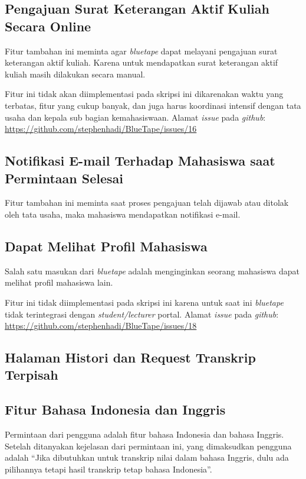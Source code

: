 \subsection{Pengajuan Surat Keterangan Aktif Kuliah Secara Online}
\label{issue:16}
Fitur tambahan ini meminta agar \textit{bluetape} dapat melayani pengajuan surat keterangan aktif kuliah. Karena untuk mendapatkan surat keterangan aktif kuliah masih dilakukan secara manual.

Fitur ini tidak akan diimplementasi pada skripsi ini dikarenakan waktu yang terbatas, fitur yang cukup banyak, dan juga harus koordinasi intensif dengan tata usaha dan kepala sub bagian kemahasiswaan. Alamat \textit{issue} pada \textit{github}: \url{https://github.com/stephenhadi/BlueTape/issues/16} 

\subsection{Notifikasi E-mail Terhadap Mahasiswa saat Permintaan Selesai}
\label{issue:17}
Fitur tambahan ini meminta saat proses pengajuan telah dijawab atau ditolak oleh tata usaha, maka mahasiswa mendapatkan notifikasi e-mail.
 

\subsection{Dapat Melihat Profil Mahasiswa}

\label{issue:18}
Salah satu masukan dari \textit{bluetape} adalah menginginkan seorang mahasiswa dapat melihat profil mahasiswa lain.

Fitur ini tidak diimplementasi pada skripsi ini karena untuk saat ini \textit{bluetape} tidak terintegrasi dengan \textit{student/lecturer} portal. Alamat \textit{issue} pada \textit{github}: \url{https://github.com/stephenhadi/BlueTape/issues/18} 

\subsection{Halaman Histori dan Request Transkrip Terpisah}
\label{issue:19}
\subsection{Fitur Bahasa Indonesia dan Inggris}
\label{issue:20}
Permintaan dari pengguna adalah fitur bahasa Indonesia dan bahasa Inggris. Setelah ditanyakan kejelasan dari permintaan ini, yang dimaksudkan pengguna adalah ``Jika dibutuhkan untuk transkrip nilai dalam bahasa Inggris, dulu ada pilihannya tetapi hasil transkrip tetap bahasa Indonesia''.


